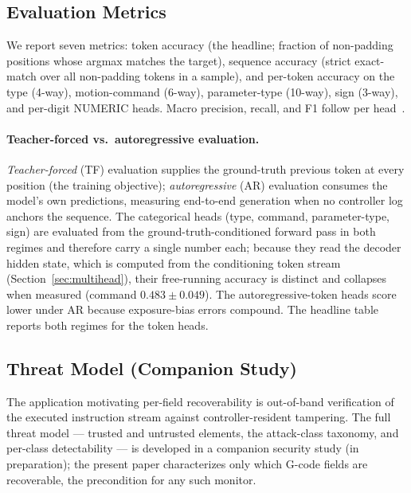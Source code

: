 \documentclass[conference]{IEEEtran}
\begin{document}
\subsection{Evaluation Metrics}
\label{sec:metrics}

We report seven metrics: token accuracy (the headline; fraction of non-padding positions whose argmax matches the target), sequence accuracy (strict exact-match over all non-padding tokens in a sample), and per-token accuracy on the type (4-way), motion-command (6-way), parameter-type (10-way), sign (3-way), and per-digit NUMERIC heads. Macro precision, recall, and F1 follow per head~\cite{pedregosa2011sklearn}.

\paragraph{Teacher-forced vs.\ autoregressive evaluation.} \emph{Teacher-forced} (TF) evaluation supplies the ground-truth previous token at every position (the training objective); \emph{autoregressive} (AR) evaluation consumes the model's own predictions, measuring end-to-end generation when no controller log anchors the sequence. The categorical heads (type, command, parameter-type, sign) are evaluated from the ground-truth-conditioned forward pass in both regimes and therefore carry a single number each; because they read the decoder hidden state, which is computed from the conditioning token stream (Section~\ref{sec:multihead}), their free-running accuracy is distinct and collapses when measured (command $0.483 \pm 0.049$). The autoregressive-token heads score lower under AR because exposure-bias errors compound. The headline table reports both regimes for the token heads.

\subsection{Threat Model (Companion Study)}
\label{sec:problem-threat-model}

The application motivating per-field recoverability is out-of-band verification of the executed instruction stream against controller-resident tampering. The full threat model --- trusted and untrusted elements, the attack-class taxonomy, and per-class detectability --- is developed in a companion security study (in preparation); the present paper characterizes only which G-code fields are recoverable, the precondition for any such monitor.

\end{document}
